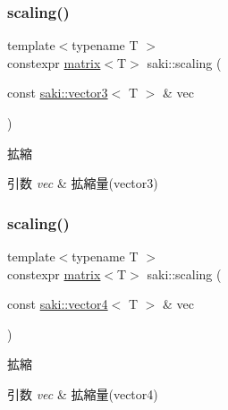 \subsubsection{\texorpdfstring{scaling()}{scaling()}\hspace{0.1cm}{\footnotesize\ttfamily [2/3]}}
{\footnotesize\ttfamily template$<$typename T $>$ \\
constexpr \mbox{\hyperlink{classsaki_1_1matrix}{matrix}}$<$T$>$ saki\+::scaling (\begin{DoxyParamCaption}\item[{const \mbox{\hyperlink{classsaki_1_1vector3}{saki\+::vector3}}$<$ T $>$ \&}]{vec }\end{DoxyParamCaption})}



拡縮 


\begin{DoxyParams}{引数}
{\em vec} & 拡縮量(vector3) \\
\hline
\end{DoxyParams}
\mbox{\label{namespacesaki_aededd0f357c48d1e96af77b06cb3e786}} 
\subsubsection{\texorpdfstring{scaling()}{scaling()}\hspace{0.1cm}{\footnotesize\ttfamily [3/3]}}
{\footnotesize\ttfamily template$<$typename T $>$ \\
constexpr \mbox{\hyperlink{classsaki_1_1matrix}{matrix}}$<$T$>$ saki\+::scaling (\begin{DoxyParamCaption}\item[{const \mbox{\hyperlink{classsaki_1_1vector4}{saki\+::vector4}}$<$ T $>$ \&}]{vec }\end{DoxyParamCaption})}



拡縮 


\begin{DoxyParams}{引数}
{\em vec} & 拡縮量(vector4) \\
\hline
\end{DoxyParams}
\mbox{\label{namespacesaki_ac51e06f83630682641e0d99d5c957a9c}} 
